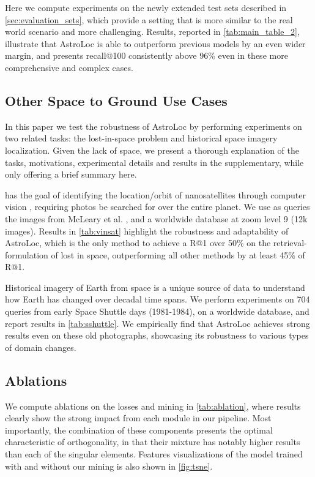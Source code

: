 Here we compute experiments on the newly extended test sets described in \cref{sec:evaluation_sets}, which provide a setting that is more similar to the real world scenario and more challenging. Results, reported in \cref{tab:main_table_2}, illustrate that AstroLoc is able to outperform previous models by an even wider margin, and presents recall@100 consistently above 96\% even in these more comprehensive and complex cases.

\subsection{Other Space to Ground Use Cases}
In this paper we test the robustness of AstroLoc by performing experiments on two related tasks: the lost-in-space problem and historical space imagery localization.
Given the lack of space, we present a thorough explanation of the tasks, motivations, experimental details and results in the supplementary, while only offering a brief summary here.
\label{sec:lost_in_space}

 has the goal of identifying the location/orbit of nanosatellites through computer vision \cite{McCleary_2024_vinsat}, requiring photos be searched for over the entire planet.
We use as queries the images from McLeary et al. \cite{McCleary_2024_vinsat}, and a worldwide database at zoom level 9 (12k images).
Results in \cref{tab:vinsat} highlight the robustness and adaptability of AstroLoc, which is the only method to achieve a R@1 over 50\% on the retrieval-formulation of lost in space, outperforming all other methods by at least 45\% of R@1.


Historical imagery of Earth from space is a unique source of data to understand how Earth has changed over decadal time spans.
We perform experiments on 704 queries from early Space Shuttle days (1981-1984), on a worldwide database, and report results in \cref{tab:sshuttle}.
We empirically find that AstroLoc achieves strong results even on these old photographs, showcasing its robustness to various types of domain changes.


\subsection{Ablations}
\label{sec:ablations}
We compute ablations on the losses and mining in \cref{tab:ablation}, where results clearly show the strong impact from each module in our pipeline.
Most importantly, the combination of these components presents the optimal characteristic of orthogonality, in that their mixture has notably higher results than each of the singular elements.
Features visualizations of the model trained with and without our mining is also shown in \cref{fig:tsne}.

